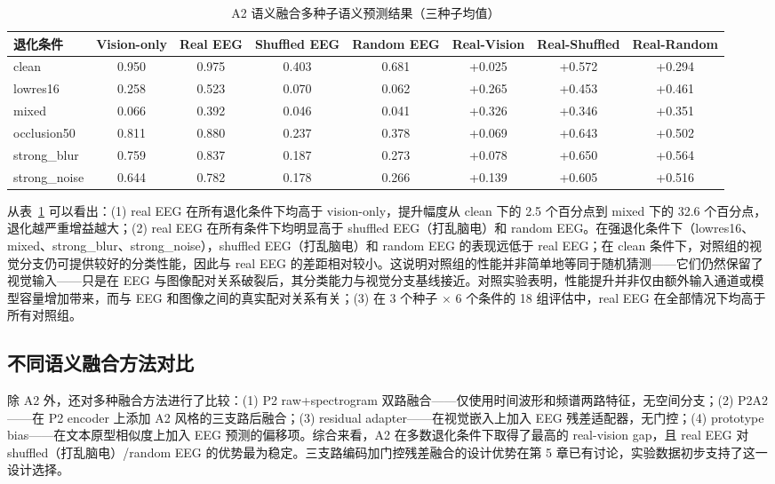 \begin{table}[htbp]
  \centering
  \caption{A2 语义融合多种子语义预测结果（三种子均值）}
  \label{tab:a2-main}
  \begin{tabular}{l c c c c c c c}
    \toprule
    退化条件 & Vision-only & Real EEG & Shuffled EEG & Random EEG & Real-Vision & Real-Shuffled & Real-Random \\
    \midrule
    clean & 0.950 & 0.975 & 0.403 & 0.681 & +0.025 & +0.572 & +0.294 \\
    lowres16 & 0.258 & 0.523 & 0.070 & 0.062 & +0.265 & +0.453 & +0.461 \\
    mixed & 0.066 & 0.392 & 0.046 & 0.041 & +0.326 & +0.346 & +0.351 \\
    occlusion50 & 0.811 & 0.880 & 0.237 & 0.378 & +0.069 & +0.643 & +0.502 \\
    strong\_blur & 0.759 & 0.837 & 0.187 & 0.273 & +0.078 & +0.650 & +0.564 \\
    strong\_noise & 0.644 & 0.782 & 0.178 & 0.266 & +0.139 & +0.605 & +0.516 \\
    \bottomrule
  \end{tabular}
\end{table}

从表~\ref{tab:a2-main} 可以看出：(1) real EEG 在所有退化条件下均高于 vision-only，提升幅度从 clean 下的 2.5 个百分点到 mixed 下的 32.6 个百分点，退化越严重增益越大；(2) real EEG 在所有条件下均明显高于 shuffled EEG（打乱脑电）和 random EEG。在强退化条件下（lowres16、mixed、strong\_blur、strong\_noise），shuffled EEG（打乱脑电）和 random EEG 的表现远低于 real EEG；在 clean 条件下，对照组的视觉分支仍可提供较好的分类性能，因此与 real EEG 的差距相对较小。这说明对照组的性能并非简单地等同于随机猜测——它们仍然保留了视觉输入——只是在 EEG 与图像配对关系破裂后，其分类能力与视觉分支基线接近。对照实验表明，性能提升并非仅由额外输入通道或模型容量增加带来，而与 EEG 和图像之间的真实配对关系有关；(3) 在 3 个种子 $\times$ 6 个条件的 18 组评估中，real EEG 在全部情况下均高于所有对照组。


\subsection{不同语义融合方法对比}

除 A2 外，还对多种融合方法进行了比较：(1) P2 raw+spectrogram 双路融合——仅使用时间波形和频谱两路特征，无空间分支；(2) P2A2——在 P2 encoder 上添加 A2 风格的三支路后融合；(3) residual adapter——在视觉嵌入上加入 EEG 残差适配器，无门控；(4) prototype bias——在文本原型相似度上加入 EEG 预测的偏移项。综合来看，A2 在多数退化条件下取得了最高的 real-vision gap，且 real EEG 对 shuffled（打乱脑电）/random EEG 的优势最为稳定。三支路编码加门控残差融合的设计优势在第 5 章已有讨论，实验数据初步支持了这一设计选择。

